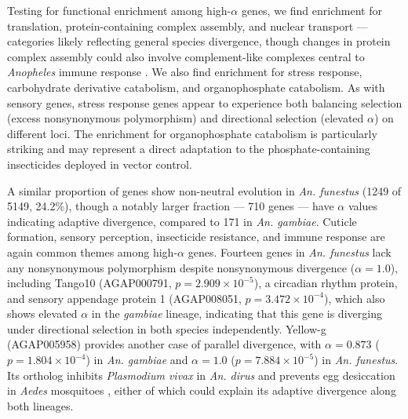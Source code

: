 Testing for functional enrichment among high-$\alpha$ genes,
we find enrichment for translation, protein-containing complex assembly,
and nuclear transport --- categories likely reflecting general species divergence,
though changes in protein complex assembly could also involve
complement-like complexes central to \textit{Anopheles} immune response
\citep{Povelones_Upton_Sala_Christophides_2011,
Povelones_Waterhouse_Kafatos_Christophides_2009}.
We also find enrichment for stress response,
carbohydrate derivative catabolism, and organophosphate catabolism.
As with sensory genes, stress response genes
appear to experience both balancing selection (excess nonsynonymous polymorphism)
and directional selection (elevated $\alpha$) on different loci.
The enrichment for organophosphate catabolism is particularly striking
and may represent a direct adaptation
to the phosphate-containing insecticides deployed in vector control.

A similar proportion of genes show non-neutral evolution in \textit{An. funestus}
(1249 of 5149, 24.2\%),
though a notably larger fraction --- 710 genes --- have $\alpha$ values
indicating adaptive divergence, compared to 171 in \textit{An. gambiae}.
Cuticle formation, sensory perception, insecticide resistance,
and immune response are again common themes among high-$\alpha$ genes.
Fourteen genes in \textit{An. funestus} lack any nonsynonymous polymorphism
despite nonsynonymous divergence ($\alpha = 1.0$),
including Tango10 (AGAP000791, $p = 2.909\times10^{-5}$),
a circadian rhythm protein,
and sensory appendage protein 1
(AGAP008051, $p = 3.472 \times 10^{-4}$),
which also shows elevated $\alpha$ in the \textit{gambiae} lineage,
indicating that this gene is diverging under directional selection
in both species independently.
Yellow-g (AGAP005958) provides another case of parallel divergence,
with $\alpha = 0.873$ ($p = 1.804\times10^{-4}$) in \textit{An. gambiae}
and $\alpha = 1.0$ ($p = 7.884\times10^{-5}$) in \textit{An. funestus}.
Its ortholog inhibits \textit{Plasmodium vivax} in \textit{An. dirus}
\citep{yellowg_plasmodium}
and prevents egg desiccation in \textit{Aedes} mosquitoes
\citep{yellowg_desiccation},
either of which could explain its adaptive divergence along both lineages.

